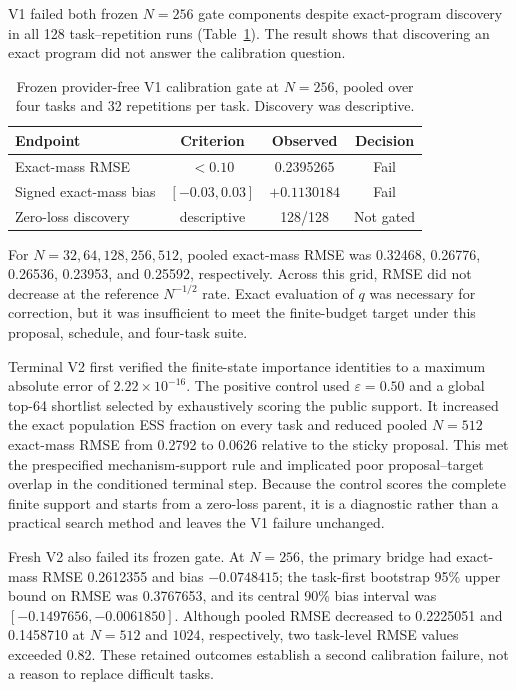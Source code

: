 \documentclass[twoside,11pt]{article}
\begin{document}
V1 failed both frozen $N=256$ gate components despite exact-program discovery
in all 128 task--repetition runs (Table~\ref{tab:calibration-gate}). The result
shows that discovering an exact program did not answer the calibration
question.

\begin{table}[!htbp]
\centering
\caption{Frozen provider-free V1 calibration gate at $N=256$, pooled over four
tasks and 32 repetitions per task. Discovery was descriptive.}
\label{tab:calibration-gate}
\begin{tabular}{@{}lccc@{}}
\toprule
Endpoint & Criterion & Observed & Decision \\
\midrule
Exact-mass RMSE & $<0.10$ & 0.2395265 & Fail \\
Signed exact-mass bias & $[-0.03,0.03]$ & $+0.1130184$ & Fail \\
Zero-loss discovery & descriptive & 128/128 & Not gated \\
\bottomrule
\end{tabular}
\end{table}
\FloatBarrier

For $N=32,64,128,256,512$, pooled exact-mass RMSE was 0.32468, 0.26776,
0.26536, 0.23953, and 0.25592, respectively. Across this grid, RMSE did not
decrease at the reference $N^{-1/2}$ rate. Exact evaluation of $q$ was
necessary for correction, but it was insufficient to meet the finite-budget
target under this proposal, schedule, and four-task suite.

Terminal V2 first verified the finite-state importance identities to a maximum
absolute error of $2.22\times10^{-16}$. The positive control used
$\varepsilon=0.50$ and a global top-64 shortlist selected by exhaustively
scoring the public support. It increased the exact population ESS fraction on
every task and reduced pooled $N=512$ exact-mass RMSE from 0.2792 to 0.0626
relative to the sticky proposal. This met the prespecified mechanism-support
rule and implicated poor proposal--target overlap in the conditioned terminal
step. Because the control scores the complete finite support and starts from a
zero-loss parent, it is a diagnostic rather than a practical search method and
leaves the V1 failure unchanged.

Fresh V2 also failed its frozen gate. At $N=256$, the primary bridge had
exact-mass RMSE 0.2612355 and bias $-0.0748415$; the task-first bootstrap
95\% upper bound on RMSE was 0.3767653, and its central 90\% bias interval was
$[-0.1497656,-0.0061850]$. Although pooled RMSE decreased to 0.2225051 and
0.1458710 at $N=512$ and $1024$, respectively, two task-level RMSE values
exceeded 0.82. These retained outcomes establish a second calibration failure,
not a reason to replace difficult tasks.
\end{document}
